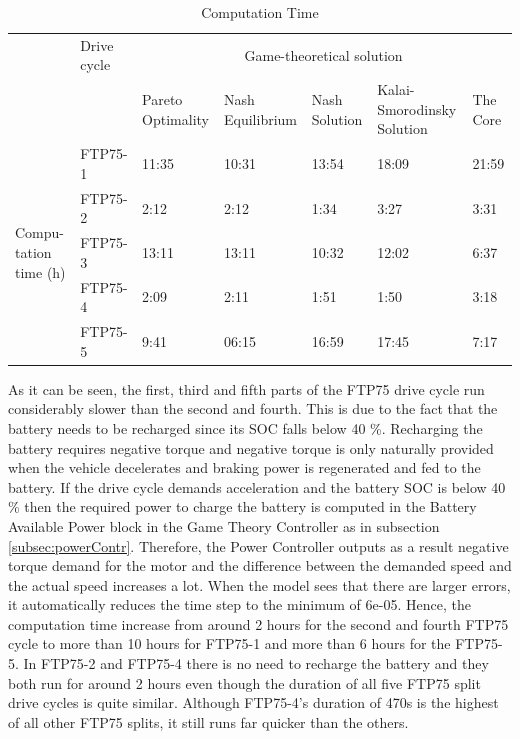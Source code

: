 \begin{table}[h]
\centering
\begin{tabular}{ |p{1.5cm}|p{1.5cm}|p{1.3cm}|p{1.3cm}|p{1.3cm}|p{1.3cm}|p{1.3cm}|} 
 \hline
  \cline{3-7}
   & Drive cycle & \multicolumn{5}{|c|}{Game-theoretical solution} \\
   \cline{3-7}
   & & Pareto Optimality & Nash Equilibrium & Nash Solution & Kalai- Smorodinsky Solution & The Core\\
 \hline\hline
 \multirow{5}{*}{\parbox{1.5cm}{Compu- tation time (h)}} 
 & FTP75-1 & 11:35 & 10:31 & 13:54 & 18:09 & 21:59 \\ 
 & FTP75-2 & 2:12 & 2:12 & 1:34 & 3:27 & 3:31 \\ 
 & FTP75-3 & 13:11 & 13:11 & 10:32 & 12:02 & 6:37 \\ 
 & FTP75-4 & 2:09 & 2:11 & 1:51 & 1:50 & 3:18 \\ 
 & FTP75-5 & 9:41 & 06:15 & 16:59 & 17:45 & 7:17 \\ 
 \hline
\end{tabular}
\caption{Computation Time}
\label{tab:config}
\end{table}

As it can be seen, the first, third and fifth parts of the FTP75 drive cycle run considerably slower than the second and fourth. This is due to the fact that the battery needs to be recharged since its SOC falls below 40 \%. Recharging the battery requires negative torque and negative torque is only naturally provided when the vehicle decelerates and braking power is regenerated and fed to the battery. If the drive cycle demands acceleration and the battery SOC is below 40 \% then the required power to charge the battery is computed in the Battery Available Power block in the Game Theory Controller as in subsection \ref{subsec:powerContr}. Therefore, the Power Controller outputs as a result negative torque demand for the motor and the difference between the demanded speed and the actual speed increases a lot. When the model sees that there are larger errors, it automatically reduces the time step to the minimum of 6e-05. Hence, the computation time increase from around 2 hours for the second and fourth FTP75 cycle to more than 10 hours for FTP75-1 and more than 6 hours for the FTP75-5. In FTP75-2 and FTP75-4 there is no need to recharge the battery and they both run for around 2 hours even though the duration of all five FTP75 split drive cycles is quite similar. Although FTP75-4's duration of 470s is the highest of all other FTP75 splits, it still runs far quicker than the others.

